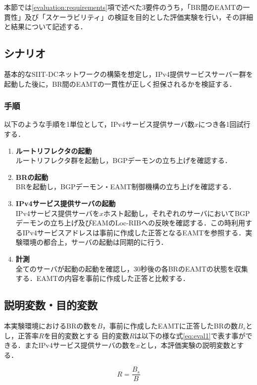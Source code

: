本節では\ref{evaluation:requirements}項で述べた3要件のうち，「BR間のEAMTの一貫性」及び「スケーラビリティ」の検証を目的とした評価実験を行い，その詳細と結果について記述する．

\subsection{シナリオ}
基本的なSIIT-DCネットワークの構築を想定し，IPv4提供サービスサーバー群を起動した後に，BR間のEAMTの一貫性が正しく担保されるかを検証する．

\subsubsection{手順}
以下のような手順を1単位として，IPv4サービス提供サーバ数$x$につき各1回試行する．
\begin{enumerate}
    \item \textbf{ルートリフレクタの起動} \\
    ルートリフレクタ群を起動し，BGPデーモンの立ち上げを確認する．
    \item \textbf{BRの起動} \\
    BRを起動し，BGPデーモン・EAMT制御機構の立ち上げを確認する．
    \item \textbf{IPv4サービス提供サーバの起動} \\
    IPv4サービス提供サーバを$x$ホスト起動し，それぞれのサーバにおいてBGPデーモンの立ち上げ及びEAMのLoc-RIBへの反映を確認する．この時利用するIPv4サービスアドレスは事前に作成した正答となるEAMTを参照する．実験環境の都合上，サーバの起動は同期的に行う．
    \item \textbf{計測} \\
    全てのサーバが起動の起動を確認し，30秒後の各BRのEAMTの状態を収集する．EAMTの内容を事前に作成した正答と比較する．
\end{enumerate}

\subsection{説明変数・目的変数}
本実験環境におけるBRの数を$B$，事前に作成したEAMTに正答したBRの数$B_s$とし，正答率$R$を目的変数とする
目的変数$R$は以下の様な式\ref{eq:eval1}で表す事ができる．またIPv4サービス提供サーバの数を$x$とし，本評価実験の説明変数とする．

\begin{equation}
    R = \frac{B_s}{B}
    \label{eq:eval1}
\end{equation}


